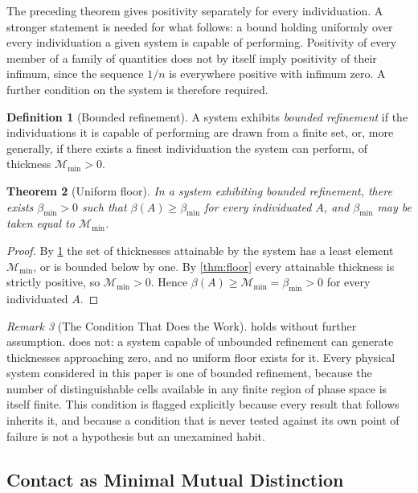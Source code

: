 \documentclass[11pt,twocolumn,a4paper]{article}
\theoremstyle{plain}
\newtheorem{theorem}{Theorem}[section]
\theoremstyle{definition}
\newtheorem{definition}[theorem]{Definition}
\theoremstyle{remark}
\newtheorem{remark}[theorem]{Remark}
\newcommand{\thick}{\beta}
\newcommand{\floor}{\thick_{\min}}
\newcommand{\Depth}{\mathcal{M}}
\begin{document}
The preceding theorem gives positivity separately for every individuation. A
stronger statement is needed for what follows: a bound holding uniformly
over every individuation a given system is capable of performing.
Positivity of every member of a family of quantities does not by itself
imply positivity of their infimum, since the sequence $1/n$ is everywhere
positive with infimum zero. A further condition on the system is therefore
required.

\begin{definition}[Bounded refinement]
\label{def:res-bounded}
A system exhibits \emph{bounded refinement} if the individuations it is
capable of performing are drawn from a finite set, or, more generally, if
there exists a finest individuation the system can perform, of thickness
$\Depth_{\min} > 0$.
\end{definition}

\begin{theorem}[Uniform floor]
\label{thm:uniform-floor}
In a system exhibiting bounded refinement, there exists $\floor > 0$ such
that $\thick(A) \geq \floor$ for every individuated $A$, and $\floor$ may be
taken equal to $\Depth_{\min}$.
\end{theorem}

\begin{proof}
By \cref{def:res-bounded} the set of thicknesses attainable by the system
has a least element $\Depth_{\min}$, or is bounded below by one. By
\cref{thm:floor} every attainable thickness is strictly positive, so
$\Depth_{\min} > 0$. Hence $\thick(A) \geq \Depth_{\min} = \floor > 0$ for
every individuated $A$.
\end{proof}

\begin{remark}[The Condition That Does the Work]
\label{rem:hypothesis}
 holds without further assumption. 
does not: a system capable of unbounded refinement can generate thicknesses
approaching zero, and no uniform floor exists for it. Every physical system
considered in this paper is one of bounded refinement, because the number of
distinguishable cells available in any finite region of phase space is
itself finite. This condition is flagged explicitly because every result
that follows inherits it, and because a condition that is never tested
against its own point of failure is not a hypothesis but an unexamined
habit.
\end{remark}

\subsection{Contact as Minimal Mutual Distinction}
\end{document}
